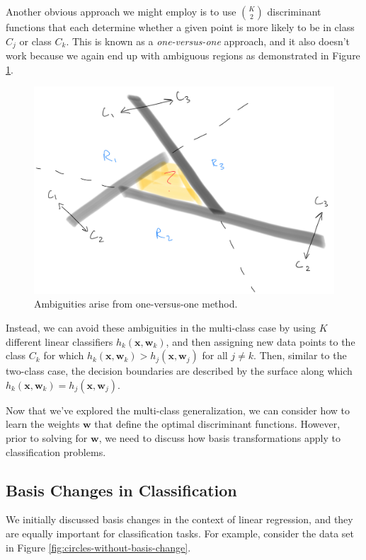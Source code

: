 Another obvious approach we might employ is to use $\binom{K}{2}$ discriminant functions that each determine whether a given point is more likely to be in class $C_{j}$ or class $C_{k}$. This is known as a \textit{one-versus-one} approach, and it also doesn't work because we again end up with ambiguous regions as demonstrated in Figure \ref{fig:one-vs-one-ambig}.

\begin{figure}
    \centering
    \includegraphics[width=0.5\paperwidth]{../Classification/fig/one_vs_one_ambig_ipad.jpg}
    \caption{Ambiguities arise from one-versus-one method.}
    \label{fig:one-vs-one-ambig}
\end{figure}

Instead, we can avoid these ambiguities in the multi-class case by using $K$ different linear classifiers $h_{k}(\textbf{x}, \textbf{w}_{k})$, and then assigning new data points to the class $C_{k}$ for which $h_{k}(\textbf{x}, \textbf{w}_{k}) > h_{j}(\textbf{x}, \textbf{w}_{j})$ for all $j \neq k$. Then, similar to the two-class case, the decision boundaries are described by the surface along which $h_{k}(\textbf{x}, \textbf{w}_{k}) = h_{j}(\textbf{x}, \textbf{w}_{j})$.

Now that we've explored the multi-class generalization, we can consider how to learn the weights $\textbf{w}$ that define the optimal discriminant functions. However, prior to solving for $\textbf{w}$, we need to discuss how basis transformations apply to classification problems.

\subsection{Basis Changes in Classification}
We initially discussed basis changes in the context of linear regression, and they are equally important for classification tasks. For example, consider the data set in Figure \ref{fig:circles-without-basis-change}.

